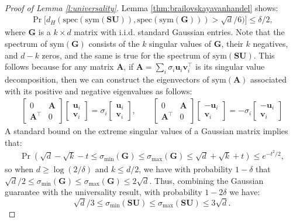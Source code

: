\documentclass[11pt]{article}
\let\origtop\top
\renewcommand\top{{\scriptscriptstyle{\origtop}}}
\def\v{{\mathbf v}}
\def\u{{\mathbf u}}
\def\A{{\mathbf A}}
\def\G{{\mathbf G}}
\def\S{{\mathbf S}}
\def\U{{\mathbf U}}
\def\sym{{\mathrm{sym}}}
\def\spec{{\mathrm{spec}}}
\begin{document}
\begin{proof}[Proof of Lemma \ref{l:universality}]
Lemma \ref{thm:brailovskayavanhandel} shows:
\begin{align*}
    \Pr\big[d_H(\spec(\sym(\S\U)),\spec(\sym(\G)))>\sqrt d/6)\big]\leq\delta/2,
\end{align*}
where $\G$ is a $k\times d$ matrix with i.i.d. standard Gaussian entries.
Note that the spectrum of $\sym(\G)$ consists of the $k$ singular values of $\G$, their $k$ negatives, and $d-k$ zeros, and the same is true for the spectrum of $\sym(\S\U)$. This follows because for any matrix $\A$, if $\A=\sum_i\sigma_i\u_i\v_i^\top$ is its singular value decomposition, then we can construct the eigenvectors of $\sym(\A)$ associated with its positive and negative eigenvalues as follows:
 \begin{align*}
   \begin{bmatrix}
     0&\A\\
     \A^\top&0
   \end{bmatrix}
\begin{bmatrix}
\u_i\\ \v_i\end{bmatrix}
=\sigma_i
\begin{bmatrix}
\u_i\\ \v_i\end{bmatrix}
   ,\qquad
   \begin{bmatrix}
     0&\A\\
     \A^\top&0
   \end{bmatrix}
\begin{bmatrix}
-\u_i\\ \v_i\end{bmatrix}
=-\sigma_i
\begin{bmatrix}
-\u_i\\ \v_i\end{bmatrix}
\end{align*}
A standard bound on the extreme singular values of a Gaussian matrix \cite{rudelson2009smallest} implies that:
\begin{align}
    \Pr(\sqrt{d}-\sqrt{k} - t\leq\sigma_{\min}(\G)\leq \sigma_{\max}(\G) \leq \sqrt{d} + \sqrt{k} + t) \leq e^{-t^2/2},
\end{align}
so when $d\geq \log(2/\delta)$ and $k\leq d/2$, we have with probability $1-\delta$ that $\sqrt d/2\leq\sigma_{\min}(\G)\leq\sigma_{\max}(\G)\leq 2\sqrt d$. Thus, combining the Gaussian guarantee with the universality result, with probability $1-2\delta$ we have:
\begin{equation*}
    \sqrt d/3\leq\sigma_{\min}(\S\U)\leq\sigma_{\max}(\S\U)\leq 3\sqrt d.
\end{equation*}
\end{proof} 
\end{document}
